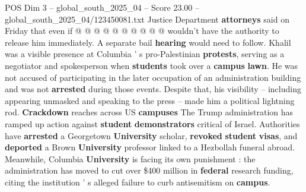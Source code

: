 \begin{textsample}{POS Dim 3 – global\_south\_2025\_04 – Score 23.00 – global\_south\_2025\_04/123450081.txt}
Justice Department \textbf{attorneys} said on Friday that even if @ @ @ @ @ @ @ @ @ @ wouldn't have the authority to release him immediately.
A separate bail \textbf{hearing} would need to follow.
Khalil was a visible presence at Columbia ' s pro-Palestinian \textbf{protests}, serving as a negotiator and spokesperson when \textbf{students} took over a \textbf{campus} \textbf{lawn}.
He was not accused of participating in the later occupation of an administration building and was not \textbf{arrested} during those events.
Despite that, his visibility -- including appearing unmasked and speaking to the press -- made him a political lightning rod. \textbf{Crackdown} reaches across US \textbf{campuses} The Trump administration has ramped up action against \textbf{student} \textbf{demonstrators} critical of Israel.
Authorities have \textbf{arrested} a Georgetown \textbf{University} scholar, \textbf{revoked} \textbf{student} \textbf{visas}, and \textbf{deported} a Brown \textbf{University} professor linked to a Hezbollah funeral abroad.
Meanwhile, Columbia \textbf{University} is facing its own punishment : the administration has moved to cut over \$400 million in \textbf{federal} research funding, citing the institution ' s alleged failure to curb antisemitism on \textbf{campus}.

\end{textsample}
